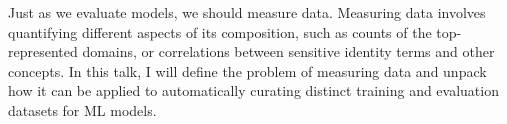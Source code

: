 Just as we evaluate models, we should measure data. Measuring data involves quantifying different aspects of its composition, such as counts of the top-represented domains, or correlations between sensitive identity terms and other concepts. In this talk, I will define the problem of measuring data and unpack how it can be applied to automatically curating distinct training and evaluation datasets for ML models.